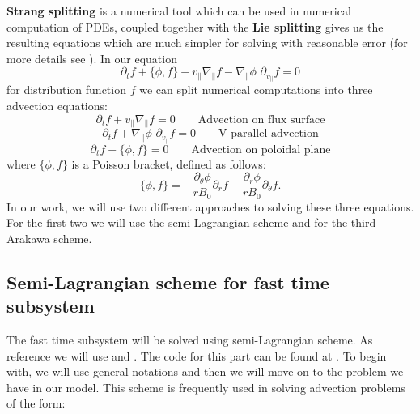 \textbf{Strang splitting} is a numerical tool which can be used in numerical computation of PDEs, coupled together with the \textbf{Lie splitting} gives us the resulting equations which are much simpler for solving with reasonable error (for more details see \cite{emily}). In our equation 
\begin{equation}
 \partial_t f + \{\phi, f \} + v_\parallel \nabla_\parallel f - \nabla_\parallel \phi\,\, \partial_{v_\parallel} f = 0
\end{equation}
for distribution function $f$ we can split numerical computations into three advection equations:
\begin{equation}
 \partial_t f + v_\parallel \nabla_\parallel f = 0 \qquad \text{Advection on flux surface}
\end{equation}
\begin{equation}
 \partial_t f + \nabla_\parallel \phi\,\, \partial_{v_{\parallel}} f = 0 \qquad \text{V-parallel advection}
 \end{equation}
\begin{equation}
 \partial_t f + \{\phi, f\} = 0 \qquad \text{Advection on poloidal plane}
\end{equation}
where $\{\phi,f\}$ is a Poisson bracket, defined as follows:
\begin{equation}
 \{\phi,f\}=-\frac{\partial_\theta\phi}{rB_0}\partial_r f + \frac{\partial_r\phi}{rB_0}\partial_\theta f.
\end{equation}
In our work, we will use two different approaches to solving these three equations. For the first two we will use the semi-Lagrangian scheme and for the third Arakawa scheme.

\subsection{Semi-Lagrangian scheme for fast time subsystem}
The fast time subsystem will be solved using semi-Lagrangian scheme. As reference we will use \cite{campospinto} and \cite{emily}. The code for this part can be found at \cite{pygyro_code}. To begin with, we will use general notations and then we will move on to the problem we have in our model. This scheme is frequently used in solving advection problems of the form:

